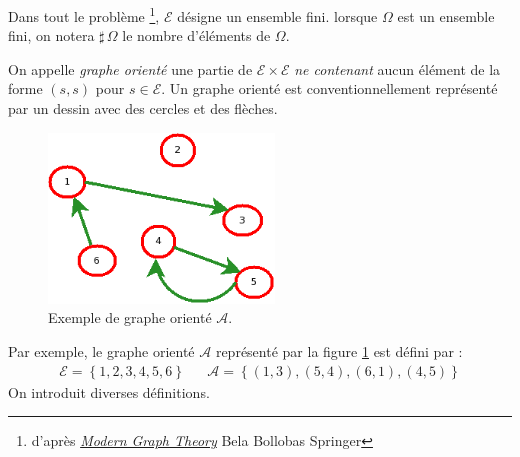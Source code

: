 Dans tout le problème \footnote{d'après \href{http://back.maquisdoc.net/v-1/index.php?act=chelt&id_elt=6651}{\emph{Modern Graph Theory}} Bela Bollobas Springer}, $\mathcal E$ désigne un ensemble fini. lorsque $\Omega$ est un ensemble fini, on notera $\sharp \, \Omega$ le nombre d'éléments de $\Omega$.

On appelle \emph{graphe orienté} une partie de $\mathcal{E}\times \mathcal{E}$ \emph{ne contenant} aucun élément de la forme $(s,s)$ pour $s\in \mathcal E$.\newline
Un graphe orienté est conventionnellement représenté par un dessin avec des cercles et des flèches. 
\begin{figure}[ht!]
 \centering
 \includegraphics[width=6cm]{Emantel_1.png}
 \caption{Exemple de graphe orienté $\mathcal{A}$.}
 \label{fig:Emantel_1}
\end{figure}
Par exemple, le graphe orienté $\mathcal{A}$ représenté par la figure  \ref{fig:Emantel_1} est défini par :
\begin{align*}
 \mathcal{E} = \left\lbrace 1,2,3,4,5,6\right\rbrace 
& &
\mathcal A = \left\lbrace (1,3),(5,4), (6,1), (4,5)\right\rbrace 
\end{align*}
On introduit diverses définitions.
